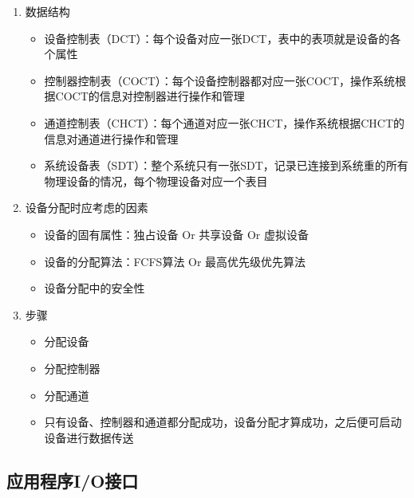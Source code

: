 \documentclass[./computer-organization-and-architecture.tex]{subfiles}
\begin{document}
    \begin{enumerate}
        \item 数据结构
        \begin{itemize}
            \item 设备控制表（DCT）：每个设备对应一张DCT，表中的表项就是设备的各个属性
            \item 控制器控制表（COCT）：每个设备控制器都对应一张COCT，操作系统根据COCT的信息对控制器进行操作和管理
            \item 通道控制表（CHCT）：每个通道对应一张CHCT，操作系统根据CHCT的信息对通道进行操作和管理
            \item 系统设备表（SDT）：整个系统只有一张SDT，记录已连接到系统重的所有物理设备的情况，每个物理设备对应一个表目
        \end{itemize}
        \item 设备分配时应考虑的因素
        \begin{itemize}
            \item 设备的固有属性：独占设备 Or 共享设备 Or 虚拟设备
            \item 设备的分配算法：FCFS算法 Or 最高优先级优先算法
            \item 设备分配中的安全性
        \end{itemize}
        \item 步骤
        \begin{itemize}
            \item 分配设备
            \item 分配控制器
            \item 分配通道
            \item 只有设备、控制器和通道都分配成功，设备分配才算成功，之后便可启动设备进行数据传送
        \end{itemize}
    \end{enumerate}

    \subsection{应用程序I/O接口}
\end{document}
